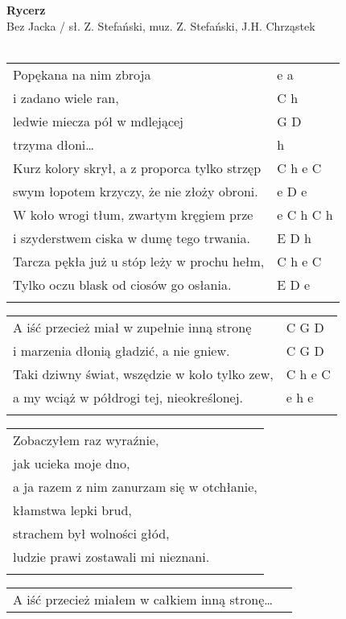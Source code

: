 \documentclass[a5paper]{article}
\begin{document}


\noindent
\fontsize{12pt}{15pt}\selectfont
\textbf{Rycerz} \\
\fontsize{8pt}{10pt}\selectfont
Bez Jacka / sł. Z. Stefański, muz. Z. Stefański, J.H. Chrząstek \\ \\
\fontsize{10pt}{12pt}\selectfont
{}
\begin{tabular}{@{}p{8.50cm}p{3cm}@{}}
\noindent
Popękana na nim zbroja & e a \\
i zadano wiele ran, & C h \\
ledwie miecza pół w mdlejącej & G D \\
trzyma dłoni… & h \\
Kurz kolory skrył, a z proporca tylko strzęp & C h e C \\
swym łopotem krzyczy, że nie złoży obroni. & e D e \\
W koło wrogi tłum, zwartym kręgiem prze & e C h C h \\
i szyderstwem ciska w dumę tego trwania. & E D h \\
Tarcza pękła już u stóp leży w prochu hełm, & C h e C \\
Tylko oczu blask od ciosów go osłania. & E D e \\ \\
\end{tabular}

\noindent
\begin{tabular}{@{}p{7.50cm}p{3cm}@{}}
A iść przecież miał w zupełnie inną stronę & C G D \\
i marzenia dłonią gładzić, a nie gniew. & C G D \\
Taki dziwny świat, wszędzie w koło tylko zew, & C h e C \\
a my wciąż w półdrogi tej, nieokreślonej. & e h e \\ \\
\end{tabular}

\noindent
\begin{tabular}{@{}p{8.50cm}@{}}
Zobaczyłem raz wyraźnie, \\
jak ucieka moje dno, \\
a ja razem z nim zanurzam się w otchłanie, \\
kłamstwa lepki brud, \\
strachem był wolności głód, \\
ludzie prawi zostawali mi nieznani. \\ \\
\end{tabular}

\noindent
\begin{tabular}{@{}p{7.50cm}p{3cm}@{}}
A iść przecież miałem w całkiem inną stronę…
\end{tabular}
\end{document}
